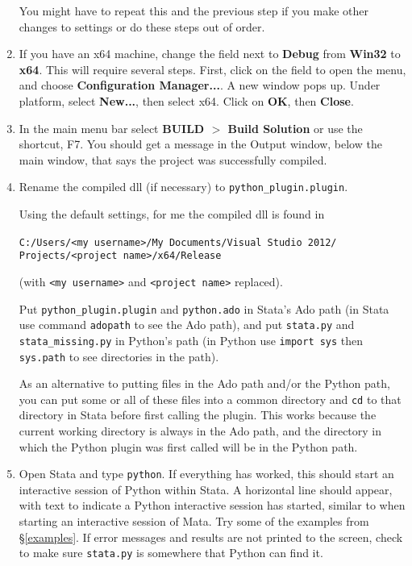 \documentclass{article}
\begin{document}
\begin{enumerate}
	You might have to repeat this and the previous step if you make other changes to settings or do these steps out of order.
		
		\item If you have an x64 machine, change the field next to \textbf{Debug} from \textbf{Win32} to \textbf{x64}. This will require several steps. First, click on the field to open the menu, and choose \textbf{Configuration Manager...}. A new window pops up. Under platform, select \textbf{New...}, then select x64. Click on \textbf{OK}, then \textbf{Close}.
	
		\item In the main menu bar select \textbf{BUILD $>$ Build Solution} or use the shortcut, F7. You should get a message in the Output window, below the main window, that says the project was successfully compiled.
	
		
		\item Rename the compiled dll (if necessary) to \lstinline$python_plugin.plugin$.
		
		Using the default settings, for me the compiled dll is found in
		
		\verb|C:/Users/<my username>/My Documents/Visual Studio 2012/|\newline
		\verb|    Projects/<project name>/x64/Release|
		
		(with \verb|<my username>| and \verb|<project name>| replaced).
		
		Put \lstinline$python_plugin.plugin$ and \lstinline$python.ado$ in Stata's Ado path (in Stata use command \lstinline{adopath} to see the Ado path), and put \lstinline$stata.py$ and \lstinline$stata_missing.py$ in Python's path (in Python use \lstinline{import sys} then \lstinline{sys.path} to see directories in the path). 
		
		As an alternative to putting files in the Ado path and/or the Python path, you can put some or all of these files into a common directory and \lstinline{cd} to that directory in Stata before first calling the plugin. This works because the current working directory is always in the Ado path, and the directory in which the Python plugin was first called will be in the Python path.
	
		\item Open Stata and type \lstinline$python$. If everything has worked, this should start an interactive session of Python within Stata. A horizontal line should appear, with text to indicate a Python interactive session has started, similar to when starting an interactive session of Mata. Try some of the examples from \S\ref{examples}. If error messages and results are not printed to the screen, check to make sure \lstinline$stata.py$ is somewhere that Python can find it.
	\end{enumerate}
	
\end{document}
